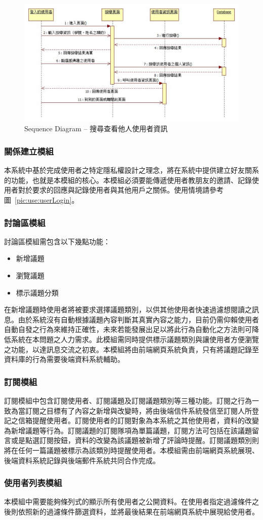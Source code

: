 \begin{figure}[H]
\centering
\includegraphics[width=\textwidth]{img/seq03.png}
\caption{Sequence Diagram -- 搜尋查看他人使用者資訊}
\label{pic:seq:searchUser}
\end{figure}

\subsubsection{關係建立模組}
\label{sssec:following}
本系統中基於完成使用者之特定隱私權設計之理念，將在系統中提供建立好友關系的功能，也就是本模組的核心。本模組必須要能傳遞使用者教朋友的邀請、記錄使用者對於要求的回應與記錄使用者與其他用戶之關係。使用情境請參考圖~\ref{pic:use:userLogin}。

\subsubsection{討論區模組}
討論區模組需包含以下幾點功能：
\begin{itemize}
\item 新增議題
\item 瀏覽議題
\item 標示議題分類
\end{itemize}
在新增議題時使用者將被要求選擇議題類別，以供其他使用者快速過濾想閱讀之訊息。由於系統沒有自動根據議題內容判斷其真實內容之能力，目前仍需仰賴使用者自動自發之行為來維持正確性，未來若能發展出足以將此行為自動化之方法則可降低系統在本問題之人力需求。此模組需同時提供標示議題類別與讓使用者方便瀏覽之功能，以達訊息交流之初衷。本模組將由前端網頁系統負責，只有將議題記錄至資料庫的行為需要後端資料系統輔助。

\subsubsection{訂閱模組}
\label{sssec:subscription}
訂閱模組中包含訂閱使用者、訂閱議題及訂閱議題類別等三種功能。訂閱之行為一致為當訂閱之目標有了內容之新增與改變時，將由後端信件系統發信至訂閱人所登記之信箱提醒使用者。訂閱使用者的訂閱對象為本系統之其他使用者，資料的改變為新增議題等行為。訂閱議題的訂閱隊項為單篇議題，訂閱方法可包括在該議題留言或是點選訂閱按鈕，資料的改變為該議題被新增了評論時提醒。訂閱議題類別則將在任何一篇議題被標示為該類別時提醒使用者。本模組需由前端網頁系統展現、後端資料系統記錄與後端郵件系統共同合作完成。


\subsubsection{使用者列表模組}
本模組中需要能夠條列式的顯示所有使用者之公開資料。在使用者指定過濾條件之後則依照新的過濾條件篩選資料，並將最後結果在前端網頁系統中展現給使用者。

